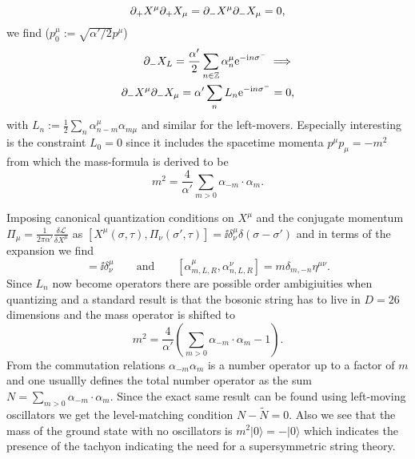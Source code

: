\begin{equation}
    \partial_+X^\mu\partial_+X_\mu =\partial_-X^\mu\partial_-X_\mu = 0,
\end{equation}
we find ($p_0^\mu:= \sqrt{\alpha'/2}p^\mu$)
\begin{equation}
    \begin{aligned}
    \partial_-X_L = \frac{\alpha'}{2}\sum_{n\in\mathbb{Z}}\alpha_{n}^\mu \mathrm{e}^{-\mathrm{i} n\sigma^-}\implies\\
    \partial_-X^\mu\partial_-X_\mu = \alpha'\sum_nL_n \mathrm{e}^{-\mathrm{i} n\sigma^-}=0,
    \end{aligned}
\end{equation}
with $L_n:=\frac{1}{2}\sum_n \alpha_{n-m}^\mu\alpha_{m\mu}$ and similar for the left-movers. Especially interesting is the constraint $L_0=0$ since it includes the spacetime momenta $p^\mu p_\mu=-m^2$ from which the mass-formula is derived to be
\begin{equation}
    m^2 = \frac{4}{\alpha'}\sum_{m>0}\alpha_{-m}\cdot \alpha_{m}.
\end{equation}

Imposing canonical quantization conditions on $X^\mu$ and the conjugate momentum $\Pi_\mu=\frac{1}{2\pi\alpha'}\frac{\delta \mathcal{L}}{\delta X^\mu}$ as $[X^\mu(\sigma,\tau),\Pi_\nu(\sigma',\tau)] = \ii \delta^\mu_\nu\delta(\sigma-\sigma')$ and in terms of the expansion we find 
\begin{equation}
    [x^\mu,p_\nu] = \ii \delta^\mu_\nu \qquad \text{and}\qquad [\alpha^\mu_{m,L,R},\alpha^\nu_{n,L,R}] = m\delta_{m,-n}\eta^{\mu\nu}.
\end{equation}
Since $L_n$ now become operators there are possible order ambigiuities when quantizing and a standard result is that the bosonic string has to live in $D=26$ dimensions and the mass operator is shifted to 
\begin{equation}
    m^2 = \frac{4}{\alpha'}\left(\sum_{m>0}\alpha_{-m}\cdot \alpha_{m}-1\right).
\end{equation}
From the commutation relations $\alpha_{-m}\alpha_{m}$ is a number operator up to a factor of $m$ and one usuallly defines the total number operator as the sum $N=\sum_{m>0}\alpha_{-m}\cdot \alpha_{m}$. Since the exact same result can be found using left-moving oscillators we get the level-matching condition $N-\tilde{N}=0$.  Also we see that the mass of the ground state with no oscillators is $m^2|0\rangle=-|0\rangle$ which indicates the presence of the tachyon indicating the need for a supersymmetric string theory. 

